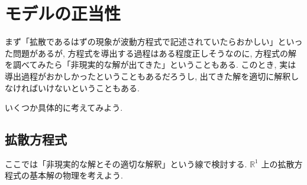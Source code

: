 \documentclass[openany, a4paper, oneside]{jsbook}
\begin{document}
\section{モデルの正当性}

まず「拡散であるはずの現象が波動方程式で記述されていたらおかしい」といった問題があるが,
方程式を導出する過程はある程度正しそうなのに,
方程式の解を調べてみたら「非現実的な解が出てきた」ということもある.
このとき, 実は導出過程がおかしかったということもあるだろうし,
出てきた解を適切に解釈しなければいけないということもある.

いくつか具体的に考えてみよう.
\subsection{拡散方程式}

ここでは「非現実的な解とその適切な解釈」という線で検討する.
$\mathbb{R}^1$ 上の拡散方程式の基本解の物理を考えよう.
\end{document}
